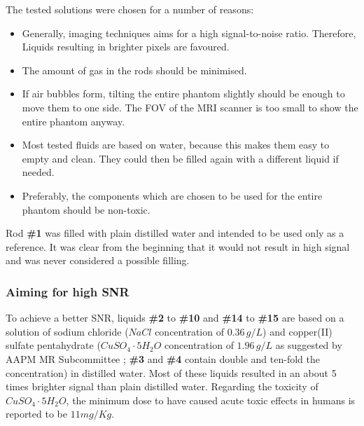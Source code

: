 The tested solutions were chosen for a number of reasons:
\begin{itemize}
\item Generally, imaging techniques aims for a high signal-to-noise ratio. Therefore, Liquids resulting in brighter pixels are favoured.
\item The amount of gas in the rods should be minimised.
\item If air bubbles form, tilting the entire phantom slightly should be enough to move them to one side. The FOV of the MRI scanner is too small to show the entire phantom anyway.
\item Most tested fluids are based on water, because this makes them easy to empty and clean.
They could then be filled again with a different liquid if needed.
\item Preferably, the components which are chosen to be used for the entire phantom should be non-toxic.
\end{itemize}

\vspace{1cm}

Rod \textbf{\#1} was filled with plain distilled water and intended to be used only as a reference.
It was clear from the beginning that it would not result in high signal and was never considered a possible filling.

\subsubsection{Aiming for high SNR}
To achieve a better SNR, liquids \textbf{\#2} to \textbf{\#10} and \textbf{\#14} to \textbf{\#15} are based on a solution of sodium chloride ($NaCl$ concentration of $0.36 \, g/L$) and copper(II) sulfate pentahydrate ($CuSO_4\cdot5H_2O$ concentration of $1.96 \, g/L$ as suggested by AAPM MR Subcommittee \cite{Jackson2009};  \textbf{\#3} and \textbf{\#4} contain double and ten-fold the concentration) in distilled water.
Most of these liquids resulted in an about 5 times brighter signal than plain distilled water.
Regarding the toxicity of $CuSO_4\cdot5H_2O$, the minimum dose to have caused acute toxic effects in humans is reported to be $11 mg/Kg$.

